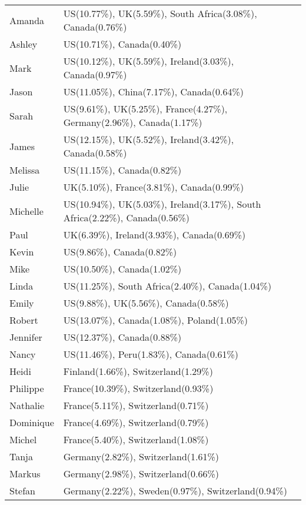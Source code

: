 \enlargethispage{28.6pt}
\begin{table*}[htbp]
\centering
\scriptsize
\renewcommand{\arraystretch}{1.1}
\begin{tabular}{@{}lp{11cm}@{}}
\toprule
Amanda   & US(10.77\%), UK(5.59\%), South Africa(3.08\%), Canada(0.76\%) \\
Ashley   & US(10.71\%), Canada(0.40\%) \\
Mark     & US(10.12\%), UK(5.59\%), Ireland(3.03\%), Canada(0.97\%) \\
Jason    & US(11.05\%), China(7.17\%), Canada(0.64\%) \\
Sarah    & US(9.61\%), UK(5.25\%), France(4.27\%), Germany(2.96\%), Canada(1.17\%) \\
James    & US(12.15\%), UK(5.52\%), Ireland(3.42\%), Canada(0.58\%) \\
Melissa  & US(11.15\%), Canada(0.82\%) \\
Julie    & UK(5.10\%), France(3.81\%), Canada(0.99\%) \\
Michelle & US(10.94\%), UK(5.03\%), Ireland(3.17\%), South Africa(2.22\%), Canada(0.56\%) \\
Paul     & UK(6.39\%), Ireland(3.93\%), Canada(0.69\%) \\
Kevin    & US(9.86\%), Canada(0.82\%) \\
Mike     & US(10.50\%), Canada(1.02\%) \\
Linda    & US(11.25\%), South Africa(2.40\%), Canada(1.04\%) \\
Emily    & US(9.88\%), UK(5.56\%), Canada(0.58\%) \\
Robert   & US(13.07\%), Canada(1.08\%), Poland(1.05\%) \\
Jennifer & US(12.37\%), Canada(0.88\%) \\
Nancy    & US(11.46\%), Peru(1.83\%), Canada(0.61\%) \\
\midrule
Heidi    & Finland(1.66\%), Switzerland(1.29\%) \\
Philippe & France(10.39\%), Switzerland(0.93\%) \\
Nathalie & France(5.11\%), Switzerland(0.71\%) \\
Dominique& France(4.69\%), Switzerland(0.79\%) \\
Michel   & France(5.40\%), Switzerland(1.08\%) \\
Tanja    & Germany(2.82\%), Switzerland(1.61\%) \\
Markus   & Germany(2.98\%), Switzerland(0.66\%) \\
Stefan   & Germany(2.22\%), Sweden(0.97\%), Switzerland(0.94\%) \\

\end{tabular}
\end{table*}
